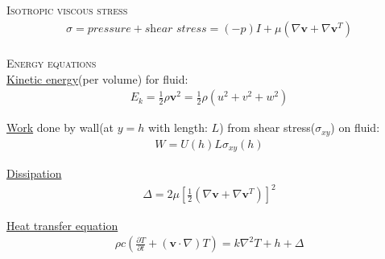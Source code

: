 \documentclass[11pt,a4paper,english]{article}
\begin{document}
{\scshape Isotropic viscous stress} \\
\begin{align*}
\sigma = pressure + \textit{shear stress} =  (-p)I + \mu (\nabla \mathbf{v}  + \nabla \mathbf{v}^T  )
\end{align*}
\\[2ex]

{\scshape Energy equations} \\

\underline{Kinetic energy}(per volume) for fluid:
\begin{align*}
E_k = \frac{1}{2} \rho \mathbf{v}^2 = \frac{1}{2} \rho (u^2 + v^2 + w^2) 
\end{align*}

\underline{Work} done by wall(at $y=h$ with length: $L$) from shear stress($\sigma_{xy}$) on fluid:
\begin{align*}
W = U(h) L \sigma_{xy}(h)
\end{align*}

\underline{Dissipation}
\begin{align*}
\Delta = 2 \mu [\frac{1}{2} (\nabla \mathbf{v}  + \nabla \mathbf{v}^T  ) ]^2
\end{align*}

\underline{Heat transfer equation}
\begin{align*}
\rho c \left(\frac{\partial T}{\partial t} + (\mathbf{v} \cdot \nabla)T \right) = k \nabla^2 T + h + \Delta 
\end{align*}
\end{document}
